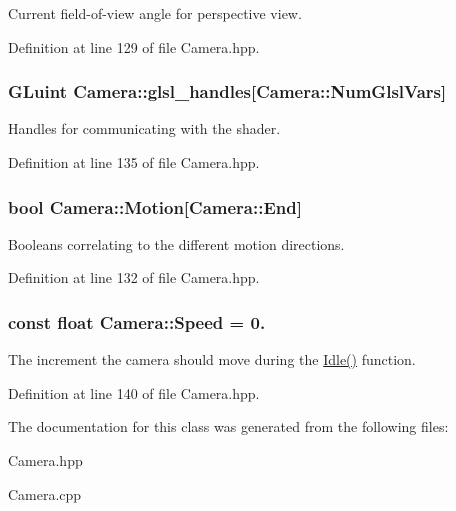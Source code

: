 \-Current field-\/of-\/view angle for perspective view. 



\-Definition at line 129 of file \-Camera.\-hpp.

\hypertarget{class_camera_a1635486d7f9e0d52b241899a270ee335}{
\subsubsection[{glsl\-\_\-handles}]{\setlength{\rightskip}{0pt plus 5cm}\-G\-Luint {\bf \-Camera\-::glsl\-\_\-handles}\mbox{[}\-Camera\-::\-Num\-Glsl\-Vars\mbox{]}}}\label{class_camera_a1635486d7f9e0d52b241899a270ee335}


\-Handles for communicating with the shader. 



\-Definition at line 135 of file \-Camera.\-hpp.

\hypertarget{class_camera_a39746b4fadf30bba6bdc8aa6acfdc6f2}{
\subsubsection[{\-Motion}]{\setlength{\rightskip}{0pt plus 5cm}bool {\bf \-Camera\-::\-Motion}\mbox{[}\-Camera\-::\-End\mbox{]}}}\label{class_camera_a39746b4fadf30bba6bdc8aa6acfdc6f2}


\-Booleans correlating to the different motion directions. 



\-Definition at line 132 of file \-Camera.\-hpp.

\hypertarget{class_camera_aedf8ba8b2af631a5a3e33b19bfa40322}{
\subsubsection[{\-Speed}]{\setlength{\rightskip}{0pt plus 5cm}const float {\bf \-Camera\-::\-Speed} = 0.}}\label{class_camera_aedf8ba8b2af631a5a3e33b19bfa40322}


\-The increment the camera should move during the \hyperlink{class_camera_aec3559fe43597656629fdb00157d3c73}{\-Idle()} function. 



\-Definition at line 140 of file \-Camera.\-hpp.



\-The documentation for this class was generated from the following files\-:\begin{DoxyCompactItemize}
\item 
\-Camera.\-hpp\item 
\-Camera.\-cpp\end{DoxyCompactItemize}
